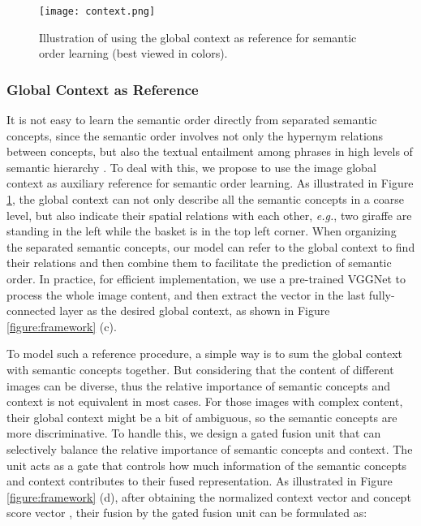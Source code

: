 \documentclass[10pt,twocolumn,letterpaper]{article}
\begin{document}
\begin{figure}[t]
\centering
\texttt{[image: context.png]}
\caption{Illustration of using the global context as reference for semantic order learning
(best viewed in colors).
}
\label{figure:context}
\end{figure}


\vspace{-3mm}
\subsubsection{Global Context as Reference}
\vspace{-1mm}
It is not easy to learn the semantic order directly from separated semantic concepts,
since the semantic order involves not only the hypernym relations between concepts,
but also the textual entailment among phrases in
high levels of semantic hierarchy \cite{vendrov2015order}.
To deal with this,
we propose to use the image global context as auxiliary reference
for semantic order learning.
As illustrated in Figure \ref{figure:context},
the global context can not only describe all the semantic concepts in a coarse level,
but also indicate their spatial relations with each other,
\emph{e.g.}, two giraffe are standing in the left while the basket is in the top left corner.
When organizing the separated semantic concepts,
our model can refer to the global context
to find their relations and then combine them to facilitate the prediction of semantic order.
In practice, for efficient implementation,
we use a pre-trained VGGNet to process the whole image content,
and then extract the vector in the last fully-connected layer
as the desired global context, as shown in Figure \ref{figure:framework} (c).


To model such a reference procedure,
a simple way is to sum the global context with semantic concepts together.
But considering that the content of different images can be diverse,
thus the relative importance of semantic concepts and context
is not equivalent in most cases.
For those images with complex content,
their global context might be a bit of ambiguous,
so the semantic concepts are more discriminative.
To handle this, we design a gated fusion unit that can selectively balance
the relative importance of semantic concepts and context.
The unit acts as a gate that controls how much information of the
semantic concepts and context contributes to their fused representation.
As illustrated in Figure \ref{figure:framework} (d),
after obtaining the normalized context vector 
and concept score vector ,
their fusion by the gated fusion unit can be
formulated as:
\end{document}
